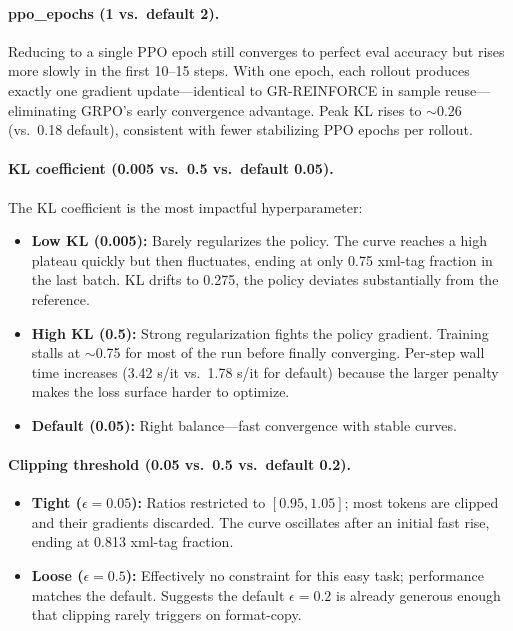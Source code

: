 \documentclass[11pt]{article}
\begin{document}
\paragraph{ppo\_epochs (1 vs.\ default 2).}
Reducing to a single PPO epoch still converges to perfect eval accuracy but rises more
slowly in the first 10--15 steps.
With one epoch, each rollout produces exactly one gradient update---identical to
GR-REINFORCE in sample reuse---eliminating GRPO's early convergence advantage.
Peak KL rises to $\sim$0.26 (vs.\ 0.18 default), consistent with fewer stabilizing
PPO epochs per rollout.

\paragraph{KL coefficient (0.005 vs.\ 0.5 vs.\ default 0.05).}
The KL coefficient is the most impactful hyperparameter:
\begin{itemize}[leftmargin=1.5em]
  \item \textbf{Low KL (0.005):} Barely regularizes the policy. The curve reaches a high
        plateau quickly but then fluctuates, ending at only 0.75 xml-tag fraction in the
        last batch. KL drifts to 0.275, the policy deviates substantially from the reference.
  \item \textbf{High KL (0.5):} Strong regularization fights the policy gradient.
        Training stalls at $\sim$0.75 for most of the run before finally converging.
        Per-step wall time increases (3.42 s/it vs.\ 1.78 s/it for default) because the
        larger penalty makes the loss surface harder to optimize.
  \item \textbf{Default (0.05):} Right balance---fast convergence with stable curves.
\end{itemize}

\paragraph{Clipping threshold (0.05 vs.\ 0.5 vs.\ default 0.2).}
\begin{itemize}[leftmargin=1.5em]
  \item \textbf{Tight ($\epsilon=0.05$):} Ratios restricted to $[0.95, 1.05]$; most tokens
        are clipped and their gradients discarded. The curve oscillates after an initial
        fast rise, ending at 0.813 xml-tag fraction.
  \item \textbf{Loose ($\epsilon=0.5$):} Effectively no constraint for this easy task;
        performance matches the default. Suggests the default $\epsilon=0.2$ is already
        generous enough that clipping rarely triggers on format-copy.
\end{itemize}
\end{document}

